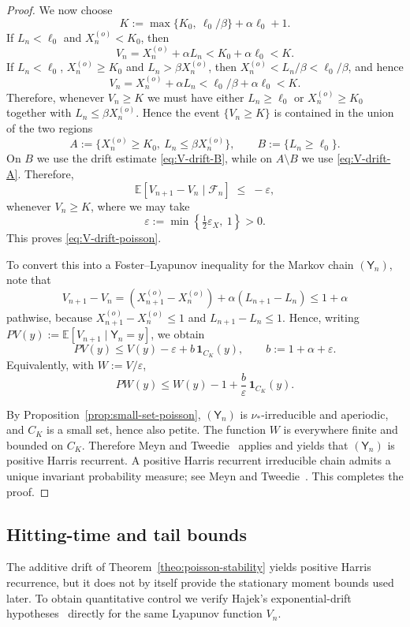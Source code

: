 \documentclass[a4paper,12pt,oneside,reqno]{amsart}
\newcommand{\E}{{\mathbb E}}
\newcommand{\F}{{\mathcal F}}
\newcommand{\1}{{\mathbf 1}}
\begin{document}
\begin{proof}
\smallskip
We now choose
\[
   K := \max\{K_0,\ \ell_0/\beta\} + \alpha \ell_0 + 1.
\]
If $L_n<\ell_0$ and $X_n^{(o)}<K_0$, then
\[
   V_n = X_n^{(o)}+\alpha L_n < K_0+\alpha\ell_0 < K.
\]
If $L_n<\ell_0$, $X_n^{(o)}\ge K_0$ and $L_n>\beta X_n^{(o)}$, then $X_n^{(o)}<L_n/\beta<\ell_0/\beta$, and hence
\[
   V_n = X_n^{(o)}+\alpha L_n < \ell_0/\beta + \alpha \ell_0 < K.
\]
Therefore, whenever $V_n\ge K$ we must have either $L_n\ge \ell_0$ or $X_n^{(o)}\ge K_0$ together with $L_n\le\beta X_n^{(o)}$. Hence the event $\{V_n\ge K\}$ is contained in the union of the two regions
\[
   A := \{X_n^{(o)}\ge K_0,\ L_n\le\beta X_n^{(o)}\},\qquad
   B := \{L_n\ge \ell_0\}.
\]
On $B$ we use the drift estimate \eqref{eq:V-drift-B}, while on $A\setminus B$ we use \eqref{eq:V-drift-A}. Therefore,
\[
   \E[V_{n+1}-V_n\mid\F_n]
   \;\le\; -\varepsilon,
\]
whenever $V_n\ge K$, where we may take
\[
   \varepsilon := \min\left\{\tfrac12\varepsilon_X,\ 1\right\}>0.
\]
This proves \eqref{eq:V-drift-poisson}.

To convert this into a Foster--Lyapunov inequality for the Markov chain $(\mathsf{Y}_n)$, note that
\[
   V_{n+1}-V_n
   =
   (X_{n+1}^{(o)}-X_n^{(o)}) + \alpha(L_{n+1}-L_n)
   \le 1+\alpha
\]
pathwise, because $X_{n+1}^{(o)}-X_n^{(o)}\le 1$ and $L_{n+1}-L_n\le 1$. Hence, writing $PV(y):=\E[V_{n+1}\mid \mathsf{Y}_n=y]$, we obtain
\[
   PV(y)\le V(y)-\varepsilon + b\,\mathbf 1_{C_K}(y),
   \qquad
   b:=1+\alpha+\varepsilon.
\]
Equivalently, with $W:=V/\varepsilon$,
\[
   PW(y)\le W(y)-1+\frac{b}{\varepsilon}\,\mathbf 1_{C_K}(y).
\]

By Proposition~\ref{prop:small-set-poisson}, $(\mathsf{Y}_n)$ is $\nu_\ast$-irreducible and aperiodic, and $C_K$ is a small set, hence also petite. The function $W$ is everywhere finite and bounded on $C_K$. Therefore Meyn and Tweedie~\cite[Theorem~11.3.4]{MeynTweedie2009} applies and yields that $(\mathsf{Y}_n)$ is positive Harris recurrent. A positive Harris recurrent irreducible chain admits a unique invariant probability measure; see Meyn and Tweedie~\cite[Theorems~10.4.4 and~10.4.10(ii)]{MeynTweedie2009}. This completes the proof.
\end{proof}

\subsection{Hitting-time and tail bounds}\label{sec:quantitative}

The additive drift of Theorem~\ref{theo:poisson-stability} yields positive Harris recurrence, but it does not by itself provide the stationary moment bounds used later. To obtain quantitative control we verify Hajek's exponential-drift hypotheses~\cite[Theorem~2.3]{Hajek:82} directly for the same Lyapunov function $V_n$.
\end{document}
